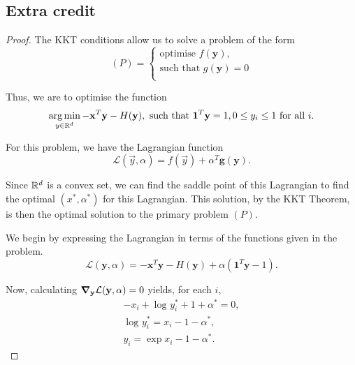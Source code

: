 \documentclass[twoside]{article}
\begin{document}
\subsection{Extra credit}
\begin{proof}
    The KKT conditions allow us to solve a problem of the form
    \begin{equation*}
        (P) = \begin{cases}
            \text{optimise } f(\mathbf{y}),\\
            \text{such that } g(\mathbf{y}) = 0\\
            \end{cases}
    \end{equation*}

    Thus, we are to optimise the function
    \begin{equation*}
        \operatorname*{arg\,min}_{y \in \mathbb{R}^{d}} - \mathbf{x}^{T}\mathbf{y} - H(\mathbf{y}),
        \text{ such that } \mathbf{1}^{T}\mathbf{y} = 1, 0 \leq y_{i} \leq 1 \text{ for all } i.
    \end{equation*}

    For this problem, we have the Lagrangian function
    \begin{equation*}
        \mathcal{L} (\vec{y}, \alpha) = f(\vec{y}) + \alpha^{T}\mathbf{g}(\mathbf{y}).
    \end{equation*}

    Since $\mathbb{R}^{d}$ is a convex set, we can find the saddle point of this Lagrangian to find the optimal $(x^{*}, \alpha^{*})$
    for this Lagrangian. This solution, by the KKT Theorem, is then the optimal solution to the primary problem $(P)$.

    We begin by expressing the Lagrangian in terms of the functions given in the problem.
    \begin{equation*}
        \mathcal{L}(\mathbf{y}, \alpha) = -\mathbf{x}^{T}\mathbf{y} - H(\mathbf{y}) + \alpha(\mathbf{1}^{T}\mathbf{y} - 1).
    \end{equation*}
    
    Now, calculating $\grad_{\mathbf{y}} \mathcal{L}(\mathbf{y, \alpha}) = 0$ yields, for each $i$,
    \begin{gather*}
        -x_{i} + \log_{}y_{i}^{*} + 1 + \alpha^{*} = 0,\\
        \log_{}y_{i}^{*} = x_{i} - 1 - \alpha^{*},\\
        y_{i} = \exp{x_{i} - 1 - \alpha^{*}}.
    \end{gather*}


\end{proof}
\end{document}
